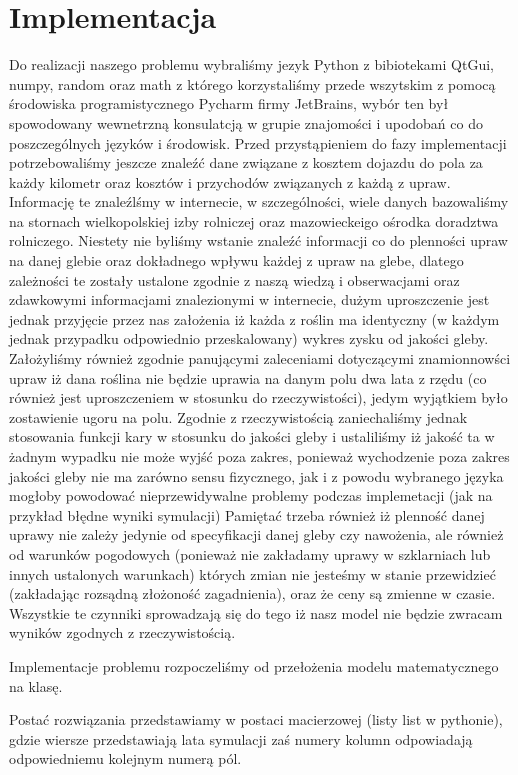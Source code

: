 \documentclass{article}
\begin{document}
\section{Implementacja}
Do realizacji naszego problemu wybraliśmy jezyk Python z bibiotekami QtGui, numpy, random oraz math z którego korzystaliśmy przede wszytskim z pomocą środowiska programistycznego Pycharm firmy JetBrains,
wybór ten był spowodowany wewnetrzną konsulatcją w grupie znajomości i upodobań co do poszczególnych języków i środowisk.
Przed przystąpieniem do fazy implementacji potrzebowaliśmy jeszcze znaleźć dane związane z kosztem dojazdu do pola za każdy kilometr oraz kosztów i przychodów związanych z każdą z upraw. Informację te znaleźlśmy w internecie, w szczególności, wiele danych bazowaliśmy na stornach wielkopolskiej izby rolniczej oraz mazowieckeigo ośrodka doradztwa rolniczego.
Niestety nie byliśmy wstanie znaleźć informacji co do plenności upraw na danej glebie oraz dokładnego wpływu każdej z upraw na glebe, dlatego zależności te zostały ustalone zgodnie z naszą wiedzą i obserwacjami oraz zdawkowymi informacjami znalezionymi w internecie, dużym uproszczenie jest jednak przyjęcie przez nas założenia iż każda z roślin ma identyczny (w każdym jednak przypadku odpowiednio przeskalowany) wykres zysku od jakości gleby.
Założyliśmy również zgodnie panującymi zaleceniami dotyczącymi znamionnowści upraw iż dana roślina nie będzie uprawia na danym polu dwa lata z rzędu (co również jest uproszczeniem w stosunku do rzeczywistości), jedym wyjątkiem było zostawienie ugoru na polu.
Zgodnie z rzeczywistością zaniechaliśmy jednak stosowania funkcji kary w stosunku do jakości gleby i ustaliliśmy iż jakość  ta w żadnym wypadku nie może wyjść poza zakres, ponieważ wychodzenie poza zakres jakości gleby nie ma zarówno sensu fizycznego, jak i z powodu wybranego języka mogłoby powodować nieprzewidywalne problemy podczas implemetacji (jak na przykład błędne wyniki symulacji)
Pamiętać trzeba również iż plenność danej uprawy nie zależy jedynie od specyfikacji danej gleby czy nawożenia, ale również od warunków pogodowych (ponieważ nie zakładamy uprawy w szklarniach lub innych ustalonych warunkach) których zmian nie jesteśmy w stanie przewidzieć (zakładając rozsądną złożoność zagadnienia),
oraz że ceny są zmienne w czasie.
Wszystkie te czynniki sprowadzają się do tego iż nasz model nie będzie zwracam wyników zgodnych z rzeczywistością.

Implementacje problemu rozpoczeliśmy od przełożenia modelu matematycznego na klasę.

\label{postac_rozw}
Postać rozwiązania przedstawiamy w postaci macierzowej (listy list w pythonie), gdzie wiersze przedstawiają lata symulacji zaś numery kolumn odpowiadają odpowiedniemu kolejnym numerą pól.
\end{document}
